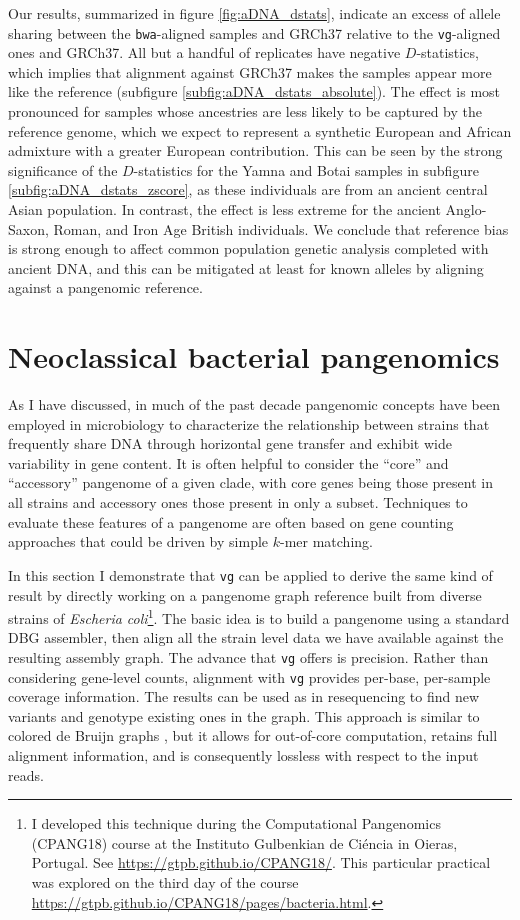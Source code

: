Our results, summarized in figure \ref{fig:aDNA_dstats}, indicate an excess of allele sharing between the {\tt bwa}-aligned samples and GRCh37 relative to the {\tt vg}-aligned ones and GRCh37.
All but a handful of replicates have negative $D$-statistics, which implies that alignment against GRCh37 makes the samples appear more like the reference (subfigure \ref{subfig:aDNA_dstats_absolute}).
The effect is most pronounced for samples whose ancestries are less likely to be captured by the reference genome, which we expect to represent a synthetic European and African admixture with a greater European contribution.
This can be seen by the strong significance of the $D$-statistics for the Yamna and Botai samples in subfigure \ref{subfig:aDNA_dstats_zscore}, as these individuals are from an ancient central Asian population.
In contrast, the effect is less extreme for the ancient Anglo-Saxon, Roman, and Iron Age British individuals.
We conclude that reference bias is strong enough to affect common population genetic analysis completed with ancient DNA, and this can be mitigated at least for known alleles by aligning against a pangenomic reference.

\section{Neoclassical bacterial pangenomics}

As I have discussed, in much of the past decade pangenomic concepts have been employed in microbiology to characterize the relationship between strains that frequently share DNA through horizontal gene transfer and exhibit wide variability in gene content.
It is often helpful to consider the ``core'' and ``accessory'' pangenome of a given clade, with core genes being those present in all strains and accessory ones those present in only a subset.
Techniques to evaluate these features of a pangenome are often based on gene counting approaches that could be driven by simple $k$-mer matching.

In this section I demonstrate that {\tt vg} can be applied to derive the same kind of result by directly working on a pangenome graph reference built from diverse strains of \emph{Escheria coli}\footnote{I developed this technique during the Computational Pangenomics (CPANG18) course at the Instituto Gulbenkian de Ci\'{e}ncia in Oieras, Portugal. See \url{https://gtpb.github.io/CPANG18/}. This particular practical was explored on the third day of the course \url{https://gtpb.github.io/CPANG18/pages/bacteria.html}.}.
The basic idea is to build a pangenome using a standard DBG assembler, then align all the strain level data we have available against the resulting assembly graph. 
The advance that {\tt vg} offers is precision.
Rather than considering gene-level counts, alignment with {\tt vg} provides per-base, per-sample coverage information.
The results can be used as in resequencing to find new variants and genotype existing ones in the graph.
This approach is similar to colored de Bruijn graphs \cite{iqbal2013}, but it allows for out-of-core computation, retains full alignment information, and is consequently lossless with respect to the input reads.

